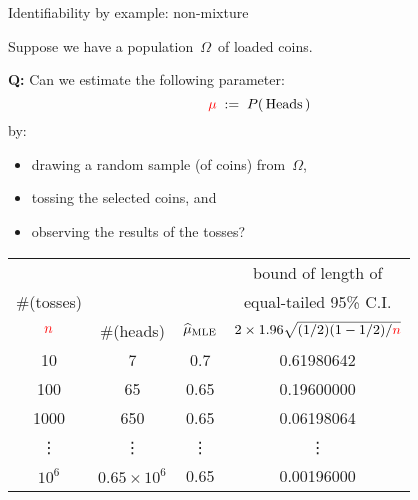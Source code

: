 
\begin{frame}{\vskip -0.2cm \Large Identifiability by example: {\LARGE non-mixture}}

\mbox{}
\vskip -0.4cm

\pause
Suppose we have a population \,$\Omega$\,  of loaded coins.

\pause
\vskip 0.3cm
\textbf{Q:}\; {\color{red}Can we estimate} the following parameter:
\begin{equation*}
{\color{red}\mu} \;:=\; P\!\left(\,\textnormal{Heads}\,\right)
\end{equation*}
\vskip -0.3cm
by:
\pause
\begin{itemize}
\item
	drawing a random sample (of coins) from \,$\Omega$,
\item
	tossing the selected coins, and
\item
	observing the results of the tosses?
\end{itemize}

\scriptsize

\pause

\begin{center}
	\begin{tabular}{|c|c|c|c|}
	\hline
	& & & bound of length of \\
	\#(tosses) & & & equal-tailed 95\% C.I. \\
	${\color{red}n}$ & \multirow{-3}{*}{\#(heads)} & \multirow{-3}{*}{$\widehat{\mu}_{\textnormal{MLE}}$} & $2 \times 1.96\sqrt{(1/2)(1-1/2)/{\color{red}n}}$ \\
	\hline
	\hline
	10 & 7 & 0.7 & 0.61980642 \\
	100 & 65 & 0.65 & 0.19600000\\
	1000 & 650 & 0.65 & 0.06198064 \\
	\vdots & \vdots & \vdots & \vdots \\
	$10^{6}$ & $0.65 \times 10^{6}$ & 0.65 &  0.00196000 \\
	\hline
	\end{tabular}
\end{center}

\end{frame}
\normalsize


